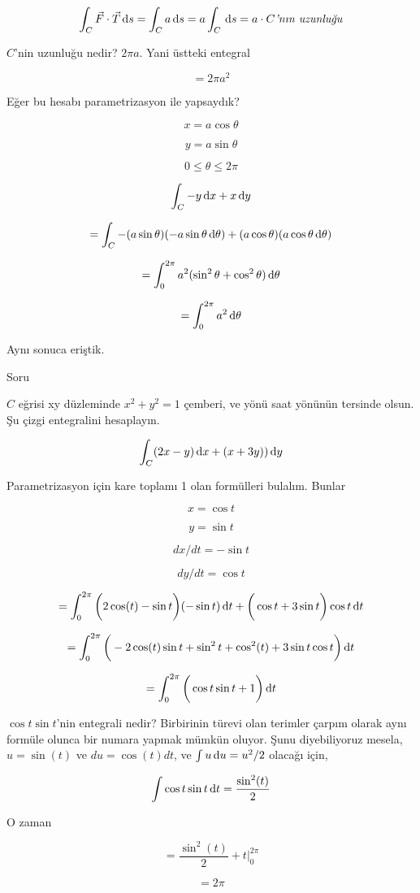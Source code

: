 \documentclass[12pt,fleqn]{article}\usepackage{../../common}
\begin{document}
$$
\int_C \vec{F} \cdot \vec{T} \,\mathrm{d} s 
=  \int_C a \,\mathrm{d} s  = a \int_C \,\mathrm{d} s 
= a \cdot C \textit{'nın uzunluğu}
$$

$C$'nin uzunluğu nedir? $2\pi a$. Yani üstteki entegral

$$ = 2\pi a^2 $$

Eğer bu hesabı parametrizasyon ile yapsaydık? 

$$ x = a\cos\theta $$

$$ y = a\sin\theta $$

$$ 0 \le \theta \le 2\pi $$

$$ \int_C -y \,\mathrm{d} x + x \,\mathrm{d} y $$

$$ = \int_C -(a\sin\theta)(-a\sin\theta \,\mathrm{d}\theta) + 
(a\cos\theta)(a \cos\theta \,\mathrm{d}\theta)
$$

$$ = \int_0^{2\pi} a^2 (\sin^2\theta + \cos^2\theta) \,\mathrm{d}\theta $$

$$ = \int_0^{2\pi} a^2 \,\mathrm{d}\theta $$

Aynı sonuca eriştik. 

Soru 

$C$ eğrisi xy düzleminde $x^2+y^2=1$ çemberi, ve yönü saat yönünün tersinde
olsun. Şu çizgi entegralini hesaplayın.

$$ \int_C (2x-y) \,\mathrm{d} x + (x+3y)) \,\mathrm{d} y $$

Parametrizasyon için kare toplamı 1 olan formülleri bulalım. Bunlar

$$ x = \cos t $$

$$ y = \sin t $$

$$ dx/dt = -\sin t$$

$$ dy/dt = \cos t $$

$$ =
\int_0^{2\pi} \bigg( 2\cos(t) - \sin t \bigg)(-\sin t ) \,\mathrm{d} t + 
\bigg(\cos t + 3\sin t \bigg) \cos t \,\mathrm{d} t
$$

$$ = 
\int_0^{2\pi}
\bigg(
-2\cos(t)\sin t + \sin^2 t + \cos^2(t) + 3 \sin t \cos t
\bigg) \,\mathrm{d} t
$$

$$ = 
\int_0^{2\pi} \bigg( \cos t \sin t + 1 \bigg) \,\mathrm{d} t
$$

$\cos t \sin t$'nin entegrali nedir? Birbirinin türevi olan terimler çarpım
olarak aynı formüle olunca bir numara yapmak mümkün oluyor. Şunu diyebiliyoruz
mesela, $u=\sin(t)$ ve $du=\cos(t)dt$, ve $\int u \,\mathrm{d} u = u^2/2$ olacağı için,

$$ \int \cos t \sin t \,\mathrm{d} t = \frac{\sin^2(t)}{2} $$

O zaman 

$$ = \frac{\sin^2(t)}{2} + t \bigg|_0^{2\pi}  $$

$$ =  2\pi $$
\end{document}
